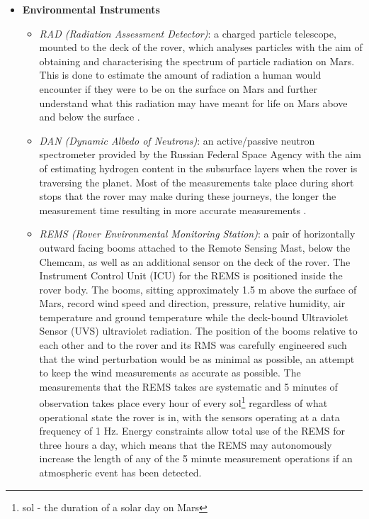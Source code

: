 \begin{itemize}
\begin{itemize}
          \end{itemize}
          \item \textbf{Environmental Instruments}
          \begin{itemize}
            \item \textit{RAD (Radiation Assessment Detector)}: a charged particle telescope, mounted to the deck of the rover, which analyses particles with the aim of obtaining and characterising the spectrum of particle radiation on Mars. This is done to estimate the amount of radiation a human would encounter if they were to be on the surface on Mars and further understand what this radiation may have meant for life on Mars above and below the surface \cite{mslsciencecornerrad}.
            \item \textit{DAN (Dynamic Albedo of Neutrons)}: an active/passive neutron spectrometer provided by the Russian Federal Space Agency with the aim of estimating hydrogen content in the subsurface layers when the rover is traversing the planet. Most of the measurements take place during short stops that the rover may make during these journeys, the longer the measurement time resulting in more accurate measurements \cite{mslsciencecornerdan}.
            \item \textit{REMS (Rover Environmental Monitoring Station)}: a pair of horizontally outward facing booms attached to the Remote Sensing Mast, below the Chemcam, as well as an additional sensor on the deck of the rover. The Instrument Control Unit (ICU) for the REMS is positioned inside the rover body. The booms, sitting approximately 1.5 m above the surface of Mars, record wind speed and direction, pressure, relative humidity, air temperature and ground temperature while the deck-bound Ultraviolet Sensor (UVS) ultraviolet radiation. The position of the booms relative to each other and to the rover and its RMS was carefully engineered such that the wind perturbation would be as minimal as possible, an attempt to keep the wind measurements as accurate as possible. The measurements that the REMS takes are systematic and 5 minutes of observation takes place every hour of every sol\footnote{sol - the duration of a solar day on Mars} regardless of what operational state the rover is in, with the sensors operating at a data frequency of 1 Hz. Energy constraints allow total use of the REMS for three hours a day, which means that the REMS may autonomously increase the length of any of the 5 minute measurement operations if an atmospheric event has been detected.

\end{itemize}
\end{itemize}
